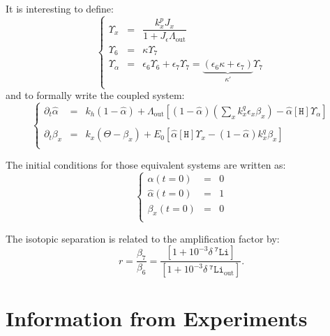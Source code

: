 \documentclass[aps,onecolumn,11pt]{revtex4}
\newcommand{\mychem}[1]{\mathtt{#1}}
\newcommand{\myconc}[1]{\left\lbrack{#1}\right\rbrack}
\newcommand{\spLi}[1]{{~^{\mychem{#1}}\mychem{Li}}}
\newcommand{\spproton}{\mychem{H}}
\newcommand{\proton}{\myconc{\spproton}}
\newcommand{\deltaLi}{ {\delta\!\!\!\spLi{7}} }
\newcommand{\deltaLiOut}{{\deltaLi}_{\mathrm{out}}}
\newcommand{\LiAll}{\Lambda}
\newcommand{\LiAllOut}{{\LiAll}_{\mathrm{out}}}
\begin{document}
It is interesting to define:
\begin{equation}
\label{eq:upsilon}
\left\lbrace
\begin{array}{rcl}
	\Upsilon_x & = & \dfrac{k^p_x J_x}{1+J_\epsilon \LiAllOut}\\
	\Upsilon_6 & = & \kappa \Upsilon_7 \\
	\Upsilon_\alpha & = & \epsilon_6 \Upsilon_6 + \epsilon_7 \Upsilon_7 = \underbrace{(\epsilon_6 \kappa + \epsilon_7)}_{\kappa'} \Upsilon_7\\
\end{array}
\right.
\end{equation}
and to formally write the coupled system:
\begin{equation}
\label{eq:sysall}
\left\lbrace
\begin{array}{rcl}
\partial_t \hat\alpha & = &
	 k_h \left(1-\hat\alpha\right) 
	 + \LiAllOut \left[ (1-\hat\alpha) \left( {\sum_x k_x^q \epsilon_x \beta_x} \right)  - \hat\alpha\proton \Upsilon_\alpha \right]\\
	 \\
	\partial_t \beta_x & = & k_x\left(\Theta - \beta_x\right) +E_0\left[ \hat\alpha  \proton \Upsilon_x - (1-\hat\alpha) k^q_x \beta_x \right]\\
\end{array}
\right.
\end{equation}

The initial conditions for those equivalent systems are written as:
\begin{equation}
\label{eq:ini}
\left\lbrace
\begin{array}{rcl}
\alpha(t=0) & = & 0\\
\hat\alpha(t=0) &= & 1\\
\beta_x(t=0)    &=& 0\\
\end{array}
\right.
\end{equation}

The isotopic separation is related to the amplification factor by:
\begin{equation}
	r=\dfrac{ \beta_7}{\beta_6} = \dfrac{\left[1+10^{-3}\deltaLi\right]}{\left[1+10^{-3}\deltaLiOut\right]}
	.
\end{equation}



\section{Information from Experiments}
\end{document}
